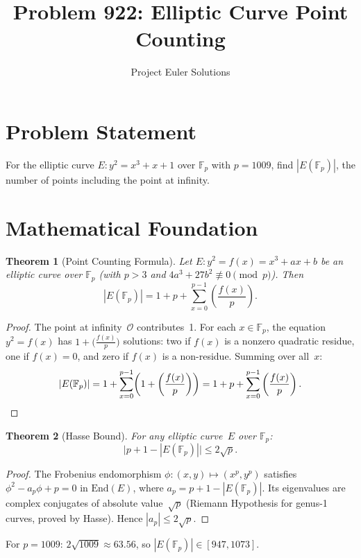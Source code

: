 \documentclass[11pt]{article}
\title{Problem 922: Elliptic Curve Point Counting}
\author{Project Euler Solutions}
\date{}
\newtheorem{theorem}{Theorem}
\theoremstyle{definition}
\begin{document}
\maketitle

\section{Problem Statement}

For the elliptic curve $E: y^2 = x^3 + x + 1$ over $\mathbb{F}_p$ with $p = 1009$, find $|E(\mathbb{F}_p)|$, the number of points including the point at infinity.

\section{Mathematical Foundation}

\begin{theorem}[Point Counting Formula]
Let $E: y^2 = f(x) = x^3 + ax + b$ be an elliptic curve over $\mathbb{F}_p$ (with $p > 3$ and $4a^3 + 27b^2 \not\equiv 0 \pmod{p}$). Then
\[
|E(\mathbb{F}_p)| = 1 + p + \sum_{x=0}^{p-1} \left(\frac{f(x)}{p}\right).
\]
\end{theorem}

\begin{proof}
The point at infinity~$\mathcal{O}$ contributes~1. For each $x \in \mathbb{F}_p$, the equation $y^2 = f(x)$ has $1 + \bigl(\frac{f(x)}{p}\bigr)$ solutions: two if $f(x)$ is a nonzero quadratic residue, one if $f(x) = 0$, and zero if $f(x)$ is a non-residue. Summing over all~$x$:
\[
|E(\mathbb{F}_p)| = 1 + \sum_{x=0}^{p-1}\!\left(1 + \left(\frac{f(x)}{p}\right)\right) = 1 + p + \sum_{x=0}^{p-1}\left(\frac{f(x)}{p}\right). \qedhere
\]
\end{proof}

\begin{theorem}[Hasse Bound]
For any elliptic curve~$E$ over $\mathbb{F}_p$:
\[
\bigl|p + 1 - |E(\mathbb{F}_p)|\bigr| \leq 2\sqrt{p}.
\]
\end{theorem}

\begin{proof}
The Frobenius endomorphism $\phi\colon (x,y)\mapsto (x^p, y^p)$ satisfies $\phi^2 - a_p\phi + p = 0$ in $\mathrm{End}(E)$, where $a_p = p + 1 - |E(\mathbb{F}_p)|$. Its eigenvalues are complex conjugates of absolute value~$\sqrt{p}$ (Riemann Hypothesis for genus-1 curves, proved by Hasse). Hence $|a_p| \leq 2\sqrt{p}$.
\end{proof}

For $p = 1009$: $2\sqrt{1009} \approx 63.56$, so $|E(\mathbb{F}_p)| \in [947, 1073]$.
\end{document}
